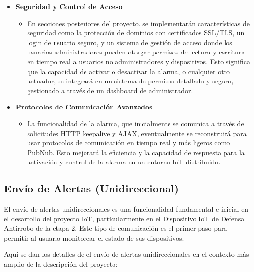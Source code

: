 \documentclass{report}
\begin{document}
\begin{itemize}
\begin{itemize}
        \item \textbf{Seguridad y Control de Acceso}
        \begin{itemize}
            \item En secciones posteriores del proyecto, se implementarán características de seguridad como la protección de dominios con certificados SSL/TLS, un 
            login de usuario seguro, y un sistema de gestión de acceso donde los usuarios administradores pueden otorgar permisos de lectura y escritura en tiempo 
            real a usuarios no administradores y dispositivos. Esto significa que la capacidad de activar o desactivar la alarma, o cualquier otro actuador, se 
            integrará en un sistema de permisos detallado y seguro, gestionado a través de un dashboard de administrador.
        \end{itemize}

        \item \textbf{Protocolos de Comunicación Avanzados}
        \begin{itemize}
            \item La funcionalidad de la alarma, que inicialmente se comunica a través de solicitudes HTTP keepalive y AJAX, eventualmente se reconstruirá para 
            usar protocolos de comunicación en tiempo real y más ligeros como PubNub. Esto mejorará la eficiencia y la capacidad de respuesta para la activación 
            y control de la alarma en un entorno IoT distribuido.
        \end{itemize}
    \end{itemize}
\end{itemize}

\subsection{Envío de Alertas (Unidireccional)}
El envío de alertas unidireccionales es una funcionalidad fundamental e inicial en el desarrollo del proyecto IoT, particularmente en el Dispositivo IoT 
de Defensa Antirrobo de la etapa 2. Este tipo de comunicación es el primer paso para permitir al usuario monitorear el estado de sus dispositivos.

Aquí se dan los detalles de el envío de alertas unidireccionales en el contexto más amplio de la descripción del proyecto:
\end{document}
